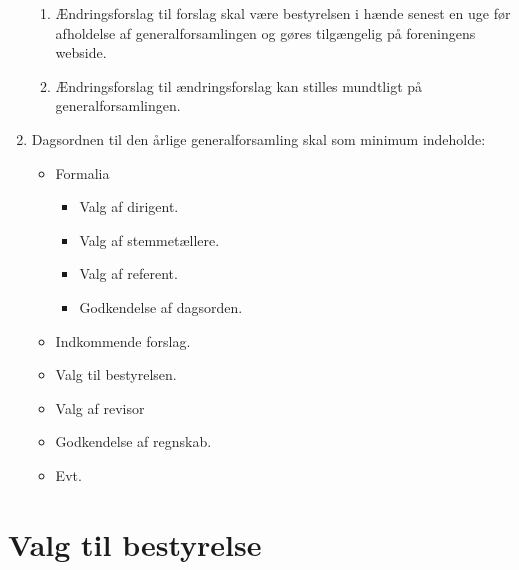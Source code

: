 \documentclass[a4paper]{article}
\newenvironment{stykenum}{
  \begin{enumerate}[%
    label=Stk.~\arabic*., ref=\textsection~\theenumi~Stk.~\arabic*, start=2]
}{\end{enumerate}}
\begin{document}
\begin{enumerate}[resume*=afsnit]
\begin{stykenum}
  \item Ændringsforslag til forslag skal være bestyrelsen i hænde senest en uge
        før afholdelse af generalforsamlingen og gøres tilgængelig på
        foreningens webside.

  \item Ændringsforslag til ændringsforslag kan stilles mundtligt på
        generalforsamlingen.

  \end{stykenum}

\item Dagsordnen til den årlige generalforsamling skal som minimum indeholde:

  \begin{itemize}
  \item Formalia
    \begin{itemize}
    \item Valg af dirigent.
    \item Valg af stemmetællere.
    \item Valg af referent.
    \item Godkendelse af dagsorden.
    \end{itemize}
  \item Indkommende forslag.
  \item Valg til bestyrelsen.
  \item Valg af revisor
  \item Godkendelse af regnskab.
  \item Evt.
  \end{itemize}

\end{enumerate}

\section*{Valg til bestyrelse}
\end{document}
